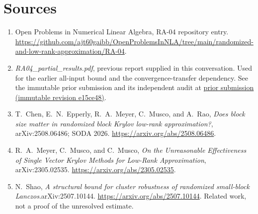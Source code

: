 \documentclass[11pt]{article}
\begin{document}
\section*{Sources}
\begin{enumerate}
\item Open Problems in Numerical Linear Algebra, RA-04 repository entry.
\url{https://github.com/ajt60gaibb/OpenProblemsInNLA/tree/main/randomized-and-low-rank-approximation/RA-04}.
\item \emph{RA04\_partial\_results.pdf}, previous report supplied in this
conversation. Used for the earlier all-input bound and the convergence-transfer
dependency. See the immutable prior submission and its independent audit at
\href{https://github.com/sidneyholden1/OpenProblemsInNLA/tree/e15ce4854d1a9c9fa457b93da78fca04febf200a/references/holden-ra04-2026-09-12}{prior submission (immutable revision e15ce48)}.
\item T.~Chen, E.~N.~Epperly, R.~A.~Meyer, C.~Musco, and A.~Rao,
\emph{Does block size matter in randomized block Krylov low-rank approximation?},
arXiv:2508.06486; SODA 2026. \url{https://arxiv.org/abs/2508.06486}.
\item R.~A.~Meyer, C.~Musco, and C.~Musco,
\emph{On the Unreasonable Effectiveness of Single Vector Krylov Methods for
Low-Rank Approximation}, arXiv:2305.02535.
\url{https://arxiv.org/abs/2305.02535}.
\item N.~Shao, \emph{A structural bound for cluster robustness of randomized
small-block Lanczos}.\newline arXiv:2507.10144.
\url{https://arxiv.org/abs/2507.10144}. Related work, not a proof of the
unresolved estimate.
\end{enumerate}
\end{document}
